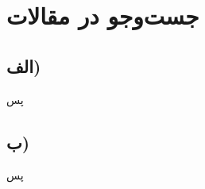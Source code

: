 \documentclass{article}
\begin{document}
\section{جست‌و‌جو در مقالات}
\subsection*{الف)}
پس
\subsection*{ب)}
پس

\clearpage

\begin{thebibliography}{99}
	\begin{latin}
		
	\end{latin}
\end{thebibliography}
\end{document}
